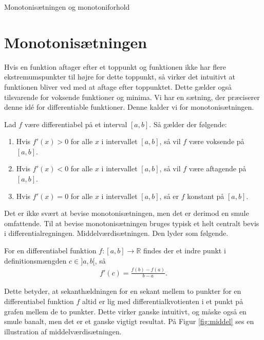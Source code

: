 \begin{center}
\Huge
Monotonisætningen og monotoniforhold
\end{center}
\section*{Monotonisætningen}
Hvis en funktion aftager efter et toppunkt og funktionen ikke har flere ekstremumspunkter til højre for dette toppunkt, så virker det intuitivt at funktionen bliver ved med at aftage efter toppunktet. Dette gælder også tilsvarende for voksende funktioner og minima. Vi har en sætning, der præciserer denne idé for differentiable funktioner. Denne kalder vi for monotonisætningen. 
\begin{setn}[Monotonisætningen]
Lad $f$ være differentiabel på et interval $[a,b]$. Så gælder der følgende:
\begin{enumerate}[label=\roman*)]
\item Hvis $f'(x)>0$ for alle $x$ i intervallet $[a,b]$, så vil $f$ være voksende på $[a,b]$.
\item Hvis $f'(x)<0$ for alle $x$ i intervallet $[a,b]$, så vil $f$ være aftagende på $[a,b]$. 
\item Hvis $f'(x)=0$ for alle $x$ i intervallet $[a,b]$, så er $f$ konstant på $[a,b]$.
\end{enumerate}
\end{setn}
Det er ikke svært at bevise monotonisætningen, men det er derimod en smule omfattende. 
Til at bevise monotonisætningen bruges typisk et helt centralt bevis i differentialregningen. Middelværdisætningen. Den lyder som følgende.
\begin{setn}[Middelværdisætningen]
	For en differentiabel funktion $f: [a,b] \to \mathbb{R}$
	findes der et indre punkt i definitionsmængden $c \in ]a,b[$, så
	\begin{align*}
		f'(c) = \frac{f(b)-f(a)}{b-a}.
	\end{align*}
\end{setn}
Dette betyder, at sekanthældningen for en sekant mellem to punkter for en differentiabel funktion $f$ altid er lig med differentialkvotienten i et punkt på grafen mellem de to punkter. Dette virker ganske intuitivt, og måske også en smule banalt, men det er et ganske vigtigt resultat.
På Figur \ref{fig:middel} ses en illustration af middelværdisætningen. 

